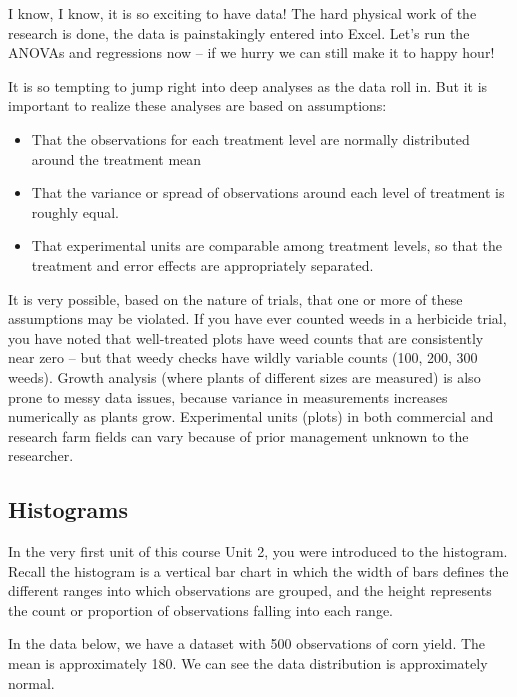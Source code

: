 \documentclass[
]{book}
\providecommand{\tightlist}{%
  \setlength{\itemsep}{0pt}\setlength{\parskip}{0pt}}
\begin{document}
I know, I know, it is so exciting to have data! The hard physical work of the research is done, the data is painstakingly entered into Excel. Let's run the ANOVAs and regressions now -- if we hurry we can still make it to happy hour!

It is so tempting to jump right into deep analyses as the data roll in. But it is important to realize these analyses are based on assumptions:

\begin{itemize}
\tightlist
\item
  That the observations for each treatment level are normally distributed around the treatment mean
\item
  That the variance or spread of observations around each level of treatment is roughly equal.
\item
  That experimental units are comparable among treatment levels, so that the treatment and error effects are appropriately separated.
\end{itemize}

It is very possible, based on the nature of trials, that one or more of these assumptions may be violated. If you have ever counted weeds in a herbicide trial, you have noted that well-treated plots have weed counts that are consistently near zero -- but that weedy checks have wildly variable counts (100, 200, 300 weeds). Growth analysis (where plants of different sizes are measured) is also prone to messy data issues, because variance in measurements increases numerically as plants grow. Experimental units (plots) in both commercial and research farm fields can vary because of prior management unknown to the researcher.

\hypertarget{histograms-1}{%
\subsection{Histograms}\label{histograms-1}}

In the very first unit of this course Unit 2, you were introduced to the histogram. Recall the histogram is a vertical bar chart in which the width of bars defines the different ranges into which observations are grouped, and the height represents the count or proportion of observations falling into each range.

In the data below, we have a dataset with 500 observations of corn yield. The mean is approximately 180. We can see the data distribution is approximately normal.
\end{document}
